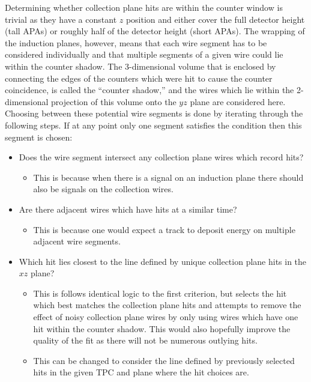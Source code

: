 Determining whether collection plane hits are within the counter window is trivial as they have a constant $z$ position and either cover the full detector height (tall APAs) or roughly half of the detector height (short APAs). The wrapping of the induction planes, however, means that each wire segment has to be considered individually and that multiple segments of a given wire could lie within the counter shadow. The 3-dimensional volume that is enclosed by connecting the edges of the counters which were hit to cause the counter coincidence, is called the ``counter shadow,'' and the wires which lie within the 2-dimensional projection of this volume onto the $yz$ plane are considered here. Choosing between these potential wire segments is done by iterating through the following steps. If at any point only one segment satisfies the condition then this segment is chosen:
\begin{itemize}
\item Does the wire segment intersect any collection plane wires which record hits?
  \begin{itemize}
  \item This is because when there is a signal on an induction plane there should also be signals on the collection wires.
  \end{itemize}
\item Are there adjacent wires which have hits at a similar time?
  \begin{itemize}
  \item This is because one would expect a track to deposit energy on multiple adjacent wire segments. 
  \end{itemize}
\item Which hit lies closest to the line defined by unique collection plane hits in the $xz$ plane?
  \begin{itemize}
  \item This is follows identical logic to the first criterion, but selects the hit which best matches the collection plane hits and attempts to remove the effect of noisy collection plane wires by only using wires which have one hit within the counter shadow. This would also hopefully improve the quality of the fit as there will not be numerous outlying hits.
  \item This can be changed to consider the line defined by previously selected hits in the given TPC and plane where the hit choices are.
  \end{itemize}
\end{itemize}

